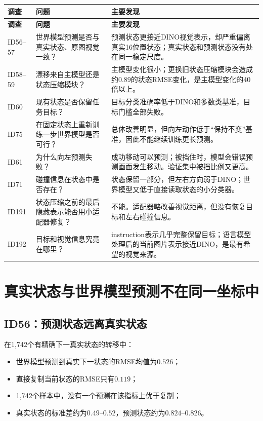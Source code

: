 \documentclass[UTF8,11pt,a4paper,fontset=none]{ctexart}
\begin{document}
\begin{longtable}{p{1.7cm}p{4.7cm}p{8.0cm}}
\toprule
\textbf{调查} & \textbf{问题} & \textbf{主要发现} \\
\midrule
\endfirsthead
\toprule
\textbf{调查} & \textbf{问题} & \textbf{主要发现} \\
\midrule
\endhead
ID56--57 & 世界模型预测是否与真实状态、原图视觉一致？ & 预测状态更接近DINO视觉表示，却严重偏离真实16位置状态；真实状态和预测状态没有处在同一稳定尺度。 \\
ID58--59 & 漂移来自主模型还是状态压缩模块？ & 主模型变化很小；更换旧状态压缩模块会造成约$0.89$的状态RMSE变化，是主模型变化的40倍以上。 \\
ID60 & 现有状态是否保留任务目标？ & 目标分类准确率低于DINO和多数类基准，目标门槛全部失败。 \\
ID75 & 在固定状态上重新训练一步世界模型是否可行？ & 总体改善明显，但向左动作低于“保持不变”基准，因此不能继续训练更长预测。 \\
ID61 & 为什么向左预测失败？ & 成功移动可以预测；被挡住时，模型会错误预测画面发生移动。验证集中被挡比例又更高。 \\
ID71 & 碰撞信息在状态中是否存在？ & 状态保留一部分，但左右方向弱于DINO；世界模型又低于直接读取状态的小分类器。 \\
ID191 & 状态压缩之前的最后隐藏表示能否用小适配器修复？ & 不能。适配器略改善视觉距离，但没有恢复目标和左右碰撞信息。 \\
ID192 & 目标和视觉信息究竟在哪里？ & instruction表示几乎完整保留目标；语言模型处理后的当前图片表示接近DINO，是最有希望的视觉来源。 \\
\bottomrule
\end{longtable}

\section{真实状态与世界模型预测不在同一坐标中}

\subsection{ID56：预测状态远离真实状态}

在1,742个有精确下一真实状态的转移中：

\begin{itemize}
  \item 世界模型预测到真实下一状态的RMSE均值为$0.526$；
  \item 直接复制当前状态的RMSE只有$0.119$；
  \item 1,742个样本中，没有一个预测在该指标上优于复制；
  \item 真实状态的标准差约为$0.49$--$0.52$，预测状态约为$0.824$--$0.826$。
\end{itemize}
\end{document}
